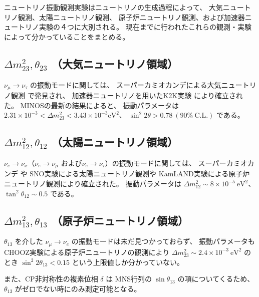 ニュートリノ振動観測実験はニュートリノの生成過程によって、
大気ニュートリノ観測、太陽ニュートリノ観測、
原子炉ニュートリノ観測、および加速器ニュートリノ実験の４つに大別される。
現在までに行われたこれらの観測・実験によって分かっていることをまとめる。


\subsection{$\Delta m_{23}^{2}, \theta_{23}$ （大気ニュートリノ領域）}

$\nu_{\mu} \rightarrow \nu_{\tau}$ の振動モードに関しては、
スーパーカミオカンデによる大気ニュートリノ観測 \cite{sk_solar} で発見され、
加速器ニュートリノを用いたK2K実験 \cite{k2k} により確立された。
MINOSの最新の結果\cite{minos}によると、
振動パラメータは
$2.31 \times 10^{-3} < \Delta m_{23}^{2} < 3.43 \times 10^{-3} \mathrm{eV^{2}}$、
$\sin^{2} 2 \theta > 0.78\ (90 \%\ \mathrm{C.L.})$ である。

\subsection{$\Delta m_{12}^{2}, \theta_{12}$ （太陽ニュートリノ領域）}

$\nu_{e} \rightarrow \nu_{x}$（$\nu_{e} \rightarrow \nu_{\mu}$
および$\nu_{e} \rightarrow \nu_{\tau}$）の振動モードに関しては、
スーパーカミオカンデ \cite{sk-solar}や SNO実験\cite{sno}による太陽ニュートリノ観測や
KamLAND実験\cite{kamland}による原子炉ニュートリノ観測により確立された。
振動パラメータは
$\Delta m_{12}^{2} \sim 8 \times 10^{-5}\ \mathrm{eV^{2}}$、
$\tan^{2}\theta_{12} \sim 0.5$ である。

\subsection{$\Delta m_{13}^{2}, \theta_{13}$ （原子炉ニュートリノ領域）}

$\theta_{13}$ を介した
$\nu_{\mu} \rightarrow \nu_{e}$ の振動モードは未だ見つかっておらず、
振動パラメータもCHOOZ実験による原子炉ニュートリノの観測\cite{chooz}により
$\Delta m_{23}^{2} \sim 2.4 \times 10^{-3}\ \mathrm{eV^{2}}$ のとき
$\sin^{2} 2 \theta_{13} < 0.15$ という上限値しか分かっていない。

また、CP非対称性の複素位相 $\delta$ は
MNS行列の $\sin \theta_{13}$ の項についてくるため、
$\theta_{13}$ がゼロでない時にのみ測定可能となる。

